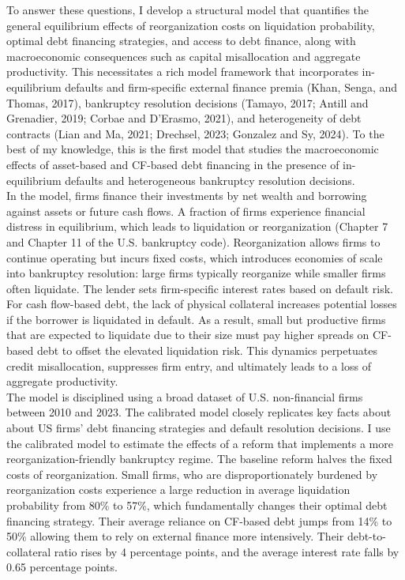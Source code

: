 \documentclass[12pt]{article}
\begin{document}
To answer these questions, I develop a structural model that quantifies the general equilibrium effects of reorganization costs on liquidation probability, optimal debt financing strategies, and access to debt finance, along with macroeconomic consequences such as capital misallocation and aggregate productivity. This necessitates a rich model framework that incorporates in-equilibrium defaults and firm-specific external finance premia (Khan, Senga, and Thomas, 2017), bankruptcy resolution decisions (Tamayo, 2017; Antill and Grenadier, 2019; Corbae and D'Erasmo, 2021), and heterogeneity of debt contracts (Lian and Ma, 2021; Drechsel, 2023; Gonzalez and Sy, 2024). To the best of my knowledge, this is the first model that studies the macroeconomic effects of asset-based and CF-based debt financing in the presence of in-equilibrium defaults and heterogeneous bankruptcy resolution decisions. \vspace{3mm} \\
In the model, firms finance their investments by net wealth and borrowing against assets or future cash flows. A fraction of firms experience financial distress in equilibrium, which leads to liquidation or reorganization (Chapter 7 and Chapter 11 of the U.S. bankruptcy code). Reorganization allows firms to continue operating but incurs fixed costs, which introduces economies of scale into bankruptcy resolution: large firms typically reorganize while smaller firms often liquidate. The lender sets firm-specific interest rates based on default risk. For cash flow-based debt, the lack of physical collateral increases potential losses if the borrower is liquidated in default. As a result, small but productive firms that are expected to liquidate due to their size must pay higher spreads on CF-based debt to offset the elevated liquidation risk. This dynamics perpetuates credit misallocation, suppresses firm entry, and ultimately leads to a loss of aggregate productivity. \vspace{3mm} \\
The model is disciplined using a broad dataset of U.S. non-financial firms between 2010 and 2023. The calibrated model closely replicates key facts about about US firms' debt financing strategies and default resolution decisions. I use the calibrated model to estimate the effects of a reform that implements a more reorganization-friendly bankruptcy regime. The baseline reform halves the fixed costs of reorganization. Small firms, who are disproportionately burdened by reorganization costs experience a large reduction in average liquidation probability from 80\% to 57\%, which fundamentally changes their optimal debt financing strategy. Their average reliance on CF-based debt jumps from 14\% to 50\% allowing them to rely on external finance more intensively. Their debt-to-collateral ratio rises by 4 percentage points, and the average interest rate falls by 0.65 percentage points. \vspace{3mm} \\
\end{document}
